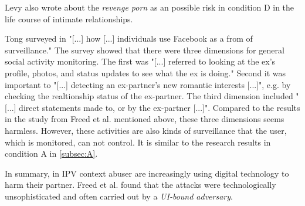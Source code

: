 Levy also wrote about the \textit{revenge porn} as an possible risk in condition D in the life course of intimate relationships.

Tong surveyed in \cite{Tong2013Facebook} "[...] how [...] individuals use Facebook as a from of surveillance." The survey showed that there were three dimensions for general social activity monitoring. The first was "[...] referred to looking at the ex's profile, photos, and status updates to see what the ex is doing." Second it was important to "[...] detecting an ex-partner's new romantic interests [...]", e.g. by checking the realtionship status of the ex-partner. The third dimension included "[...] direct statements made to, or by the ex-partner [...]".
Compared to the results in the study from Freed et al. \cite{freed2018stalker} mentioned above, these three dimensions seems harmless. However, these activities are also kinds of surveillance that the user, which is monitored, can not control. It is similar to the research results in condition A in \ref*{subsec:A}.

In summary, in \acs{IPV} context abuser are increasingly using digital technology to harm their partner. Freed et al. \cite{freed2018stalker} found that the attacks were technologically unsophisticated and often carried out by a \textit{UI-bound adversary}.









